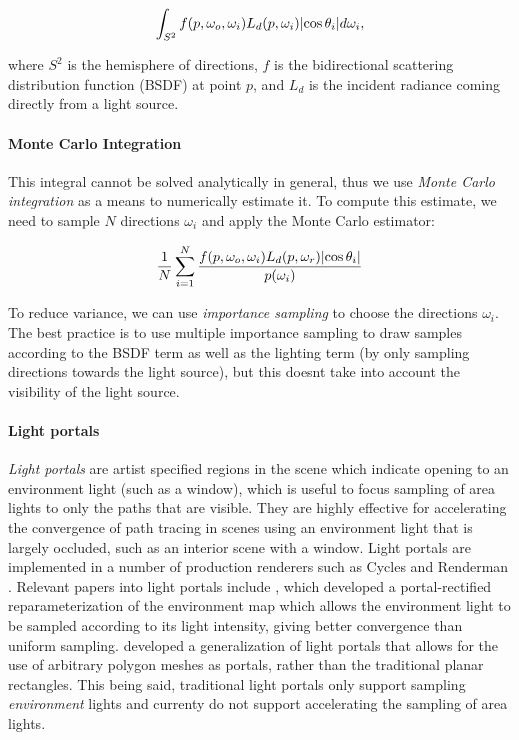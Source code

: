 \documentclass[twocolumn]{article}
\DeclarePairedDelimiter{\abs}{\lvert}{\rvert}
\begin{document}
\begin{equation}
  \int_{S^2} f(p, \omega_o, \omega_i) L_d(p, \omega_i) \abs{\cos\theta_i} d\omega_i,
\end{equation}

where $S^2$ is the hemisphere of directions, $f$ is the bidirectional scattering distribution function (BSDF) at point $p$, and $L_d$ is the incident radiance coming directly from a light source. 

\paragraph*{Monte Carlo Integration}
This integral cannot be solved analytically in general, thus we use \emph{Monte Carlo integration} as a means to numerically estimate it. To compute this estimate, we need to sample $N$ directions $\omega_i$ and apply the Monte Carlo estimator:

\begin{equation}
  \frac{1}{N} \sum_{i=1}^N \frac{f(p, \omega_o, \omega_i) L_d(p, \omega_r) \abs{\cos\theta_i}}{p(\omega_i)}
\end{equation}

To reduce variance, we can use \emph{importance sampling} to choose the directions $\omega_i$. The best practice is to use multiple importance sampling \cite{veachROBUSTMONTECARLO} to draw samples according to the BSDF term as well as the lighting term (by only sampling directions towards the light source), but this doesnt take into account the visibility of the light source.

\paragraph{Light portals}
\emph{Light portals} are artist specified regions in the scene which indicate opening to an environment light (such as a window), which is useful to focus sampling of area lights to only the paths that are visible. They are highly effective for accelerating the convergence of path tracing in scenes using an environment light that is largely occluded, such as an interior scene with a window. Light portals are implemented in a number of production renderers such as Cycles \cite{LightSettingsBlender} and Renderman \cite{PxrPortalLight}. Relevant papers into light portals include \cite{bitterliPortalMaskedEnvironment2015}, which developed a portal-rectified reparameterization of the environment map which allows the environment light to be sampled according to its light intensity, giving better convergence than uniform sampling. \cite{ogakiGeneralizedLightPortals2020} developed a generalization of light portals that allows for the use of arbitrary polygon meshes as portals, rather than the traditional planar rectangles. This being said, traditional light portals only support sampling \emph{environment} lights and currenty do not support accelerating the sampling of area lights.
\end{document}

